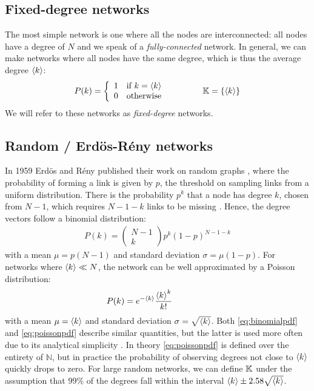 \subsection{Fixed-degree networks}
The most simple network is one where all the nodes are interconnected: all nodes have a degree of $N$ and we speak of a \textsl{fully-connected} network. In general, we can make networks where all nodes have the same degree, which is thus the average degree ${\langle k\rangle}$:
\begin{align}
P(k) = \left\{\begin{array}{ll}1 & \text{if } k=\kmean \\0 & \text{otherwise}\end{array}\right. \hspace{15mm} \K = \{ \kmean \} \label{eq:diracpdf}
\end{align}
We will refer to these networks as \textsl{fixed-degree} networks. 


\subsection{Random / Erd{\"o}s-R{\'e}ny networks}
In 1959 Erd{\"o}s and R{\'e}ny published their work on random graphs \cite{RandomGraphs1959}, where the probability of forming a link is given by $p$, the threshold on sampling links from a uniform distribution. There is the probability $p^k$ that a node has degree $k$, chosen from $N-1$, which requires $N-1-k$ links to be missing \cite{BarabasiNetworkBook2016}. Hence, the degree vectors follow a binomial distribution:
\begin{align}
P(k)=\left(\begin{array}{c}N-1 \\ k\end{array}\right) p^{k}(1-p)^{N-1-k} \label{eq:binomialpdf}
\end{align}
with a mean $\mu = p(N-1)$ and standard deviation $\sigma = \mu(1-p)$. For networks where ${\langle k\rangle} \ll N$, the network can be well approximated by a Poisson distribution:
\begin{align}
P(k) = e^{-\kmean} \frac{\kmean^{k}}{k !} \hspace{15mm} \label{eq:poissonpdf}
\end{align}
with a mean $\mu = {\langle k\rangle}$ and standard deviation $\sigma = \sqrt{{\langle k\rangle}}$. Both \eqref{eq:binomialpdf} and \eqref{eq:poissonpdf} describe similar quantities, but the latter is used more often due to its analytical simplicity \cite{BarabasiNetworkBook2016}. 
In theory \eqref{eq:poissonpdf} is defined over the entirety of $\mathbb{N}$, but in practice the probability of observing degrees not close to ${\langle k\rangle}$ quickly drops to zero. For large random networks, we can define ${\mathbb{K}}$ under the assumption that 99\% of the degrees fall within the interval ${\langle k\rangle} \pm 2.58 \sqrt{{\langle k\rangle}}$.

